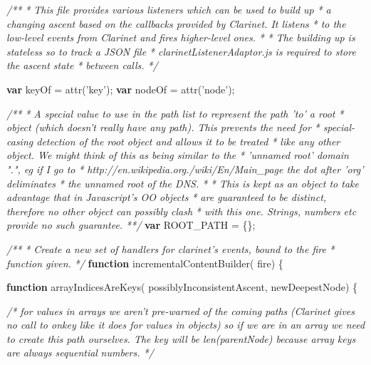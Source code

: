 \documentclass[]{article}
\newenvironment{Shaded}{}{}
\newcommand{\KeywordTok}[1]{\textcolor[rgb]{0.00,0.44,0.13}{\textbf{{#1}}}}
\newcommand{\StringTok}[1]{\textcolor[rgb]{0.25,0.44,0.63}{{#1}}}
\newcommand{\CommentTok}[1]{\textcolor[rgb]{0.38,0.63,0.69}{\textit{{#1}}}}
\newcommand{\FunctionTok}[1]{\textcolor[rgb]{0.02,0.16,0.49}{{#1}}}
\newcommand{\NormalTok}[1]{{#1}}
\begin{document}
\begin{Shaded}
\begin{Highlighting}[]
\CommentTok{/** }
\CommentTok{ * This file provides various listeners which can be used to build up}
\CommentTok{ * a changing ascent based on the callbacks provided by Clarinet. It listens}
\CommentTok{ * to the low-level events from Clarinet and fires higher-level ones.}
\CommentTok{ *  }
\CommentTok{ * The building up is stateless so to track a JSON file}
\CommentTok{ * clarinetListenerAdaptor.js is required to store the ascent state}
\CommentTok{ * between calls.}
\CommentTok{ */}


\KeywordTok{var} \NormalTok{keyOf = }\FunctionTok{attr}\NormalTok{(}\StringTok{'key'}\NormalTok{);}
\KeywordTok{var} \NormalTok{nodeOf = }\FunctionTok{attr}\NormalTok{(}\StringTok{'node'}\NormalTok{);}


\CommentTok{/** }
\CommentTok{ * A special value to use in the path list to represent the path 'to' a root }
\CommentTok{ * object (which doesn't really have any path). This prevents the need for }
\CommentTok{ * special-casing detection of the root object and allows it to be treated }
\CommentTok{ * like any other object. We might think of this as being similar to the }
\CommentTok{ * 'unnamed root' domain ".", eg if I go to }
\CommentTok{ * http://en.wikipedia.org./wiki/En/Main_page the dot after 'org' deliminates }
\CommentTok{ * the unnamed root of the DNS.}
\CommentTok{ * }
\CommentTok{ * This is kept as an object to take advantage that in Javascript's OO objects }
\CommentTok{ * are guaranteed to be distinct, therefore no other object can possibly clash }
\CommentTok{ * with this one. Strings, numbers etc provide no such guarantee. }
\CommentTok{ **/}
\KeywordTok{var} \NormalTok{ROOT_PATH = \{\};}


\CommentTok{/**}
\CommentTok{ * Create a new set of handlers for clarinet's events, bound to the fire }
\CommentTok{ * function given.  }
\CommentTok{ */} 
\KeywordTok{function} \FunctionTok{incrementalContentBuilder}\NormalTok{( fire) \{}


   \KeywordTok{function} \FunctionTok{arrayIndicesAreKeys}\NormalTok{( possiblyInconsistentAscent, newDeepestNode) \{}
   
      \CommentTok{/* for values in arrays we aren't pre-warned of the coming paths }
\CommentTok{         (Clarinet gives no call to onkey like it does for values in objects) }
\CommentTok{         so if we are in an array we need to create this path ourselves. The }
\CommentTok{         key will be len(parentNode) because array keys are always sequential }
\CommentTok{         numbers. */}


\end{Highlighting}
\end{Shaded}
\end{document}
